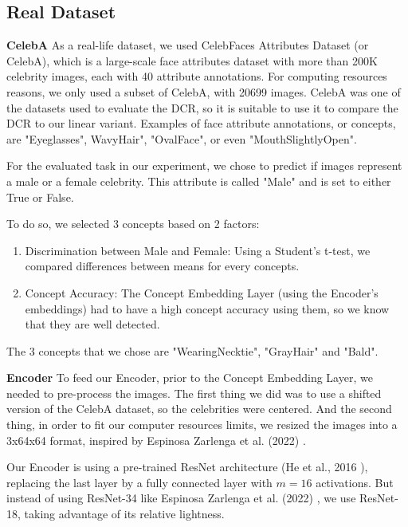 \documentclass[sigconf, nonacm]{acmart}
\begin{document}
\subsection{Real Dataset}
\vspace{2pt}
\textbf{CelebA} As a real-life dataset, we used CelebFaces Attributes Dataset (or CelebA), which is a large-scale face attributes dataset with more than 200K celebrity images, each with 40 attribute annotations. For computing resources reasons, we only used a subset of CelebA, with 20699 images. CelebA was one of the datasets used to evaluate the DCR, so it is suitable to use it to compare the DCR to our linear variant. Examples of face attribute annotations, or concepts, are "Eyeglasses", Wavy\textunderscore Hair", "Oval\textunderscore Face", or even "Mouth\textunderscore Slightly\textunderscore Open".

For the evaluated task in our experiment, we chose to predict if images represent a male or a female celebrity. This attribute is called "Male" and is set to either True or False.

To do so, we selected 3 concepts based on 2 factors: \vspace{4pt}
\begin{enumerate}
    \item Discrimination between Male and Female: Using a Student's t-test, we compared differences between means for every concepts. \vspace{1pt}
    \item Concept Accuracy: The Concept Embedding Layer (using the Encoder's embeddings) had to have a high concept accuracy using them, so we know that they are well detected.
\end{enumerate}
The 3 concepts that we chose are "Wearing\textunderscore Necktie", "Gray\textunderscore Hair" and "Bald". \vspace{8pt}

\textbf{Encoder} To feed our Encoder, prior to the Concept Embedding Layer, we needed to pre-process the images. The first thing we did was to use a shifted version of the CelebA dataset, so the celebrities were centered. And the second thing, in order to fit our computer resources limits, we resized the images into a 3x64x64 format, inspired by Espinosa Zarlenga et al. (2022) \cite{espinosa2022concept}.

Our Encoder is using a pre-trained ResNet architecture (He et al., 2016 \cite{he2016residuallearning}), replacing the last layer by a fully connected layer with \( m = 16 \) activations. But instead of using ResNet-34 like Espinosa Zarlenga et al. (2022) \cite{espinosa2022concept}, we use ResNet-18, taking advantage of its relative lightness. \vspace{8pt}
\end{document}

